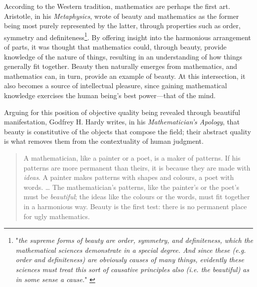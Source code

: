According to the Western tradition, mathematics are perhaps the first art. Aristotle, in his \emph{Metaphysics}, wrote of beauty and mathematics as the former being most purely represented by the latter, through properties such as order, symmetry and definiteness\footnote{"\emph{the supreme forms of beauty are order, symmetry, and definiteness, which the mathematical sciences demonstrate in a special degree. And since these (e.g. order and definiteness) are obviously causes of many things, evidently these sciences must treat this sort of causative principles also (i.e. the beautiful) as in some sense a cause.}" \citep{aristotle_metaphysics_2006}}. By offering insight into the harmonious arrangement of parts, it was thought that mathematics could, through beauty, provide knowledge of the nature of things, resulting in an understanding of how things generally fit together. Beauty then naturally emerges from mathematics, and mathematics can, in turn, provide an example of beauty. At this intersection, it also becomes a source of intellectual pleasure, since gaining mathematical knowledge exercises the human being's best power—that of the mind.

Arguing for this position of objective quality being revealed through beautiful manifestation, Godfrey H. Hardy writes, in his \emph{Mathematician's Apology}, that beauty is constitutive of the objects that compose the field; their abstract quality is what removes them from the contextuality of human judgment.

\begin{quote}
    A mathematician, like a painter or a poet, is a maker of patterns. If his patterns are more permanent than theirs, it is because they are made with \emph{ideas}. A painter makes patterns with shapes and colours, a poet with words.
    \dots
    The mathematician's patterns, like the painter's or the poet's must be \emph{beautiful}; the ideas like the colours or the words, must fit together in a harmonious way. Beauty is the first test: there is no permanent place for ugly mathematics. \citep{hardy_mathematician_2012}
\end{quote}

